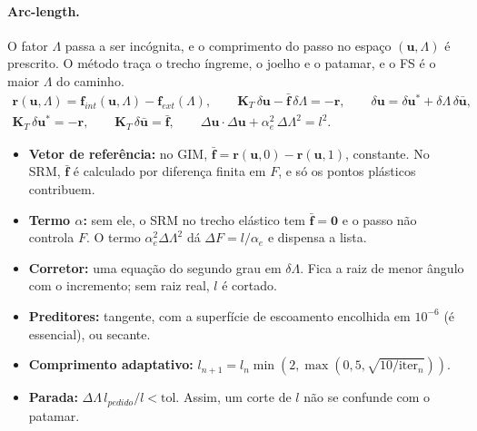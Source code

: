 \paragraph{Arc-length.} O fator $\Lambda$ passa a ser incógnita, e o comprimento do passo no espaço $(\bm u, \Lambda)$ é
prescrito. O método traça o trecho íngreme, o joelho e o patamar, e o FS é o maior $\Lambda$ do caminho.
\begin{gather}
  \bm r(\bm u, \Lambda) = \bm f_{int}(\bm u, \Lambda) - \bm f_{ext}(\Lambda), \qquad
  \bm K_T\,\delta\bm u - \bar{\bm f}\,\delta\Lambda = -\bm r, \qquad
  \delta\bm u = \delta\bm u^* + \delta\Lambda\,\delta\bar{\bm u}, \\
  \bm K_T\,\delta\bm u^* = -\bm r, \qquad \bm K_T\,\delta\bar{\bm u} = \bar{\bm f}, \qquad
  \Delta\bm u\cdot\Delta\bm u + \alpha_e^2\,\Delta\Lambda^2 = l^2 .
\end{gather}
\begin{itemize}
  \item \textbf{Vetor de referência:} no GIM, $\bar{\bm f} = \bm r(\bm u, 0) - \bm r(\bm u, 1)$, constante. No SRM,
    $\bar{\bm f}$ é calculado por diferença finita em $F$, e só os pontos plásticos contribuem.
  \item \textbf{Termo $\alpha$:} sem ele, o SRM no trecho elástico tem $\bar{\bm f} = \bm 0$ e o passo não controla $F$.
    O termo $\alpha_e^2 \Delta\Lambda^2$ dá $\Delta F = l/\alpha_e$ e dispensa a lista.
  \item \textbf{Corretor:} uma equação do segundo grau em $\delta\Lambda$. Fica a raiz de menor ângulo com o incremento;
    sem raiz real, $l$ é cortado.
  \item \textbf{Preditores:} tangente, com a superfície de escoamento encolhida em $10^{-6}$ (é essencial), ou secante.
  \item \textbf{Comprimento adaptativo:} $l_{n+1} = l_n \min(2, \max(0{,}5, \sqrt{10/\mathrm{iter}_n}))$.
  \item \textbf{Parada:} $\Delta\Lambda\, l_{pedido}/l < \mathrm{tol}$. Assim, um corte de $l$ não se confunde com o
    patamar.
\end{itemize}

